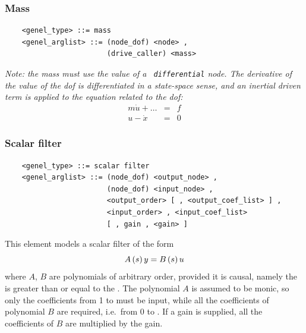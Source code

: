 \subsubsection{Mass}
\begin{verbatim}
    <genel_type> ::= mass
    <genel_arglist> ::= (node_dof) <node> ,                     
                        (drive_caller) <mass>
\end{verbatim}
{\em
    Note: the mass must use the  value of a {\tt
    differential} node. The derivative of the  value of
    the dof is differentiated in a state-space sense, and an inertial driven
    term is applied to the equation related to the dof:
    \begin{eqnarray*}
        m\dot{u} + \ldots & = & f \\
	u - \dot{x} & = & 0
    \end{eqnarray*}
}

\subsubsection{Scalar filter}
\begin{verbatim}
    <genel_type> ::= scalar filter
    <genel_arglist> ::= (node_dof) <output_node> ,
                        (node_dof) <input_node> ,
                        <output_order> [ , <output_coef_list> ] ,
                        <input_order> , <input_coef_list>
                        [ , gain , <gain> ]
\end{verbatim}
This element models a scalar filter of the form
\begin{displaymath}
    A\left( s \right)y = B\left( s \right)u
\end{displaymath}
where $ A $, $ B $ are polynomials of arbitrary order, provided it is
causal, namely the  is greater than or equal to 
the .
The polynomial $ A $ is assumed to be monic, so only the coefficients
from 1 to  must be input, while all the coefficients 
of polynomial $ B $ are required, i.e.\ from 0 to .
If a gain is supplied, all the coefficients of $ B $ are multiplied by the
gain.

